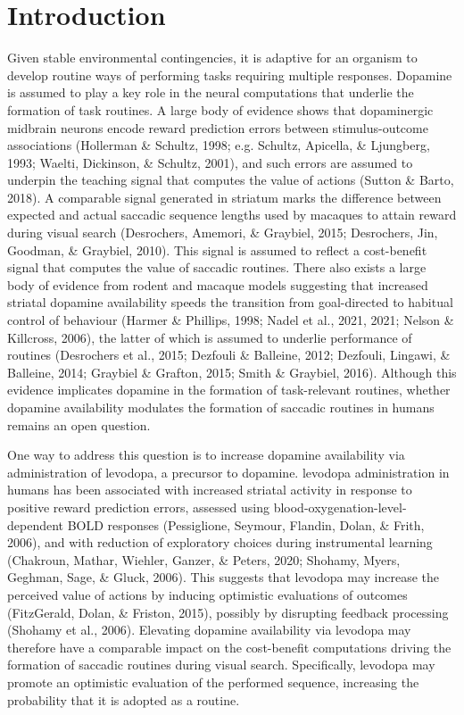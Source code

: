 \documentclass[
  man]{apa6}
\begin{document}
\hypertarget{introduction}{%
\section{Introduction}\label{introduction}}

\label{sec:Introduction}

Given stable environmental contingencies, it is adaptive for an organism to develop routine ways of performing tasks requiring multiple responses. Dopamine is assumed to play a key role in the neural computations that underlie the formation of task routines. A large body of evidence shows that dopaminergic midbrain neurons encode reward prediction errors between stimulus-outcome associations (Hollerman \& Schultz, 1998; e.g. Schultz, Apicella, \& Ljungberg, 1993; Waelti, Dickinson, \& Schultz, 2001), and such errors are assumed to underpin the teaching signal that computes the value of actions (Sutton \& Barto, 2018). A comparable signal generated in striatum marks the difference between expected and actual saccadic sequence lengths used by macaques to attain reward during visual search (Desrochers, Amemori, \& Graybiel, 2015; Desrochers, Jin, Goodman, \& Graybiel, 2010). This signal is assumed to reflect a cost-benefit signal that computes the value of saccadic routines. There also exists a large body of evidence from rodent and macaque models suggesting that increased striatal dopamine availability speeds the transition from goal-directed to habitual control of behaviour (Harmer \& Phillips, 1998; Nadel et al., 2021, 2021; Nelson \& Killcross, 2006), the latter of which is assumed to underlie performance of routines (Desrochers et al., 2015; Dezfouli \& Balleine, 2012; Dezfouli, Lingawi, \& Balleine, 2014; Graybiel \& Grafton, 2015; Smith \& Graybiel, 2016). Although this evidence implicates dopamine in the formation of task-relevant routines, whether dopamine availability modulates the formation of saccadic routines in humans remains an open question.

One way to address this question is to increase dopamine availability via administration of levodopa, a precursor to dopamine. levodopa administration in humans has been associated with increased striatal activity in response to positive reward prediction errors, assessed using blood-oxygenation-level-dependent BOLD responses (Pessiglione, Seymour, Flandin, Dolan, \& Frith, 2006), and with reduction of exploratory choices during instrumental learning (Chakroun, Mathar, Wiehler, Ganzer, \& Peters, 2020; Shohamy, Myers, Geghman, Sage, \& Gluck, 2006). This suggests that levodopa may increase the perceived value of actions by inducing optimistic evaluations of outcomes (FitzGerald, Dolan, \& Friston, 2015), possibly by disrupting feedback processing (Shohamy et al., 2006). Elevating dopamine availability via levodopa may therefore have a comparable impact on the cost-benefit computations driving the formation of saccadic routines during visual search. Specifically, levodopa may promote an optimistic evaluation of the performed sequence, increasing the probability that it is adopted as a routine.
\end{document}
